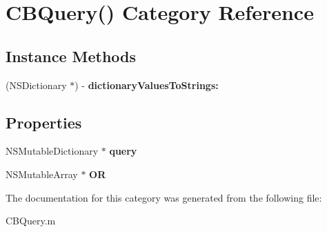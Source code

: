 \hypertarget{category_c_b_query_07_08}{\section{C\+B\+Query() Category Reference}
\label{category_c_b_query_07_08}
}
\subsection*{Instance Methods}
\begin{DoxyCompactItemize}
\item 
\hypertarget{category_c_b_query_07_08_abec846bf09cf27bb81de57485416d516}{(N\+S\+Dictionary $\ast$) -\/ {\bfseries dictionary\+Values\+To\+Strings\+:}}\label{category_c_b_query_07_08_abec846bf09cf27bb81de57485416d516}

\end{DoxyCompactItemize}
\subsection*{Properties}
\begin{DoxyCompactItemize}
\item 
\hypertarget{category_c_b_query_07_08_a44c199651c37b422ba5d9b2ee0f70150}{N\+S\+Mutable\+Dictionary $\ast$ {\bfseries query}}\label{category_c_b_query_07_08_a44c199651c37b422ba5d9b2ee0f70150}

\item 
\hypertarget{category_c_b_query_07_08_add581855d14363fa3de237576f8fbb57}{N\+S\+Mutable\+Array $\ast$ {\bfseries O\+R}}\label{category_c_b_query_07_08_add581855d14363fa3de237576f8fbb57}

\end{DoxyCompactItemize}


The documentation for this category was generated from the following file\+:\begin{DoxyCompactItemize}
\item 
C\+B\+Query.\+m\end{DoxyCompactItemize}
